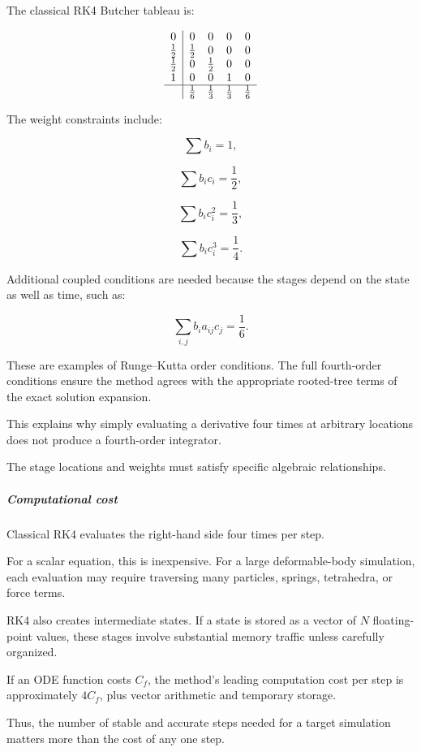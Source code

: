The classical RK4 Butcher tableau is:

\[
\begin{array}{c|cccc} 0&0&0&0&0\\ \frac12&\frac12&0&0&0\\ \frac12&0&\frac12&0&0\\ 1&0&0&1&0\\ \hline &\frac16&\frac13&\frac13&\frac16 \end{array}
\]

The weight constraints include:

\[
\sum b_i=1,
\]

\[
\sum b_ic_i=\frac12,
\]

\[
\sum b_ic_i^2=\frac13,
\]

\[
\sum b_ic_i^3=\frac14.
\]

Additional coupled conditions are needed because the stages depend on the state as well as time, such as:

\[
\sum_{i,j}b_i a_{ij}c_j=\frac16.
\]

These are examples of Runge--Kutta order conditions. The full fourth-order conditions ensure the method agrees with the appropriate rooted-tree terms of the exact solution expansion.

This explains why simply evaluating a derivative four times at arbitrary locations does not produce a fourth-order integrator.

The stage locations and weights must satisfy specific algebraic relationships.

\subparagraph{Computational cost}\label{02-foundations-ii-ch025-computational-cost}

\hypertarget{02-foundations-ii-ch025-computational-cost}{}

Classical RK4 evaluates the right-hand side four times per step.

For a scalar equation, this is inexpensive. For a large deformable-body simulation, each evaluation may require traversing many particles, springs, tetrahedra, or force terms.

RK4 also creates intermediate states. If a state is stored as a vector of \(N\) floating-point values, these stages involve substantial memory traffic unless carefully organized.

If an ODE function costs \(C_f\), the method's leading computation cost per step is approximately \(4C_f\), plus vector arithmetic and temporary storage.

Thus, the number of stable and accurate steps needed for a target simulation matters more than the cost of any one step.

